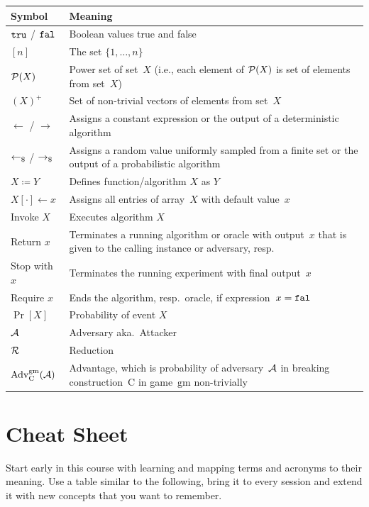 \documentclass[a4paper,orivec]{llncs}
\begin{document}
\noindent
\begin{tabularx}{\linewidth}{l X}\toprule
    \textbf{Symbol} & \textbf{Meaning}\\\midrule
    $\mathtt{tru}$ / $\mathtt{fal}$ & Boolean values true and false\\
    $[n]$ & The set $\{1,\dots,n\}$\\
    $\mathcal{P}(X)$ & Power set of set~$X$ (i.e., each element of $\mathcal{P}(X)$ is set of elements from set~$X$)\\
    $(X)^+$ & Set of non-trivial vectors of elements from set~$X$\\
    $\gets$ / $\to$ & Assigns a constant expression or the output of a deterministic algorithm\\
    $\getsr$ / $\tor$ & Assigns a random value uniformly sampled from a finite set or the output of a probabilistic algorithm\\
    $X\coloneqq Y$ & Defines function/algorithm $X$ as $Y$\\
    $X[\cdot]\gets x$ & Assigns all entries of array~$X$ with default value~$x$\\
    Invoke $X$ & Executes algorithm $X$\\
    Return $x$ & Terminates a running algorithm or oracle with output~$x$ that is given to the calling instance or adversary, resp.\\
    Stop with $x$ & Terminates the running experiment with final output~$x$\\
    Require $x$ & Ends the algorithm, resp.~oracle, if expression~$x=\mathtt{fal}$\\
    $\Pr[X]$ & Probability of event $X$\\
    $\mathcal{A}$ & Adversary aka.\ Attacker\\
    $\mathcal{R}$ & Reduction\\
    $\mathrm{Adv}_\mathrm{C}^\mathrm{gm}(\mathcal{A})$ & Advantage, which is probability of adversary~$\mathcal{A}$ in breaking construction~$\mathrm{C}$ in game~$\mathrm{gm}$ non-trivially\\
    \bottomrule
\end{tabularx}

\section{Cheat Sheet}
Start early in this course with learning and mapping terms and acronyms to their meaning.
Use a table similar to the following, bring it to every session and extend it with new concepts that you want to remember.
\end{document}
